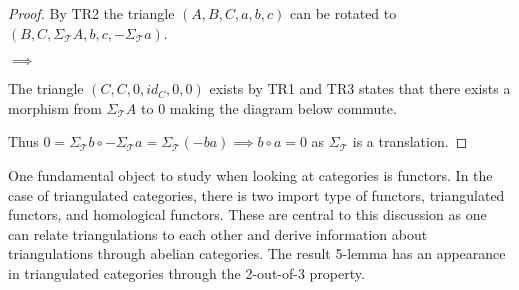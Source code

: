     \begin{proof}
        By TR2 the triangle $(A,B,C,a,b,c)$ can be rotated to $(B,C,\Sigma_{\mathcal{T}}A,b,c,-\Sigma_{\mathcal{T}}a)$.
        \begin{center}
             $\implies$
        \end{center}
        The triangle $(C,C,0,id_C,0,0)$ exists by TR1 and TR3 states that there exists a morphism from $\Sigma_{\mathcal{T}}A$ to 0 making the diagram below commute.
        \begin{center}
        \end{center}
        Thus $0 = \Sigma_{\mathcal{T}}b\circ -\Sigma_{\mathcal{T}}a = \Sigma_{\mathcal{T}}(-ba) \implies b\circ a = 0$ as $\Sigma_{\mathcal{T}}$ is a translation.
    \end{proof}
    One fundamental object to study when looking at categories is functors. In the case of triangulated categories, there is two import type of functors, triangulated functors, and homological functors. These are central to this discussion as one can relate triangulations to each other and derive information about triangulations through abelian categories. The result 5-lemma has an appearance in triangulated categories through the 2-out-of-3 property.
    
